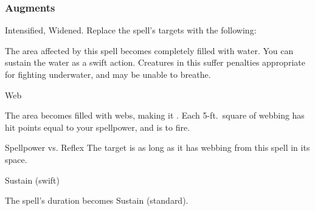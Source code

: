 \subsubsection{Augments}
 Intensified, Widened.
Replace
the spell's targets with the following:
\begin{augmenttargetinginfo}
\end{augmenttargetinginfo}
The area affected by this spell becomes completely filled with water.
You can sustain the water as a swift action.
Creatures in this  suffer penalties appropriate for fighting underwater, and may be unable to breathe.
\begin{spellsection}{Web}
\begin{spellheader}
\end{spellheader}
\begin{spellcontent}
\begin{spelltargetinginfo}
\end{spelltargetinginfo}
\begin{spelleffects}
\spelleffect
The area becomes filled with webs, making it .
Each 5-ft.\ square of webbing has hit points equal to your spellpower, and is  to fire.
\begin{spellattack}{Spellpower vs. Reflex}
\spellsuccess The target is \immobilized as long as it has webbing from this spell in its space.
\end{spellattack}
\spelldur Sustain (swift)
\end{spelleffects}
\end{spellcontent}
\begin{spellfooter}
\miscastexplode
\end{spellfooter}
\begin{spellcantrip}
The spell's duration becomes Sustain (standard).
\end{spellcantrip}
\end{spellsection}

